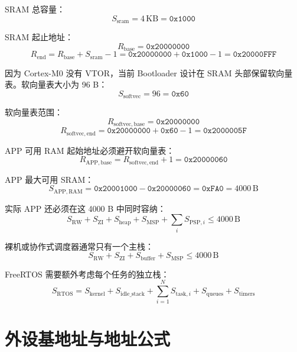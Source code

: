 \documentclass[UTF8,a4paper,11pt]{ctexart}
\newcommand{\addr}[1]{\texttt{#1}}
\begin{document}
SRAM 总容量：
\[
  S_{\mathrm{sram}} = 4\,\mathrm{KB} = \addr{0x1000}
\]

SRAM 起止地址：
\[
  R_{\mathrm{base}} = \addr{0x20000000}
\]
\[
  R_{\mathrm{end}}
  = R_{\mathrm{base}} + S_{\mathrm{sram}} - 1
  = \addr{0x20000000} + \addr{0x1000} - 1
  = \addr{0x20000FFF}
\]

因为 Cortex-M0 没有 VTOR，当前 Bootloader 设计在 SRAM 头部保留软向量表。软向量表大小为 96 B：
\[
  S_{\mathrm{softvec}} = 96 = \addr{0x60}
\]

软向量表范围：
\[
  R_{\mathrm{softvec,base}} = \addr{0x20000000}
\]
\[
  R_{\mathrm{softvec,end}}
  = \addr{0x20000000} + \addr{0x60} - 1
  = \addr{0x2000005F}
\]

APP 可用 RAM 起始地址必须避开软向量表：
\[
  R_{\mathrm{APP,base}}
  = R_{\mathrm{softvec,end}} + 1
  = \addr{0x20000060}
\]

APP 最大可用 SRAM：
\[
  S_{\mathrm{APP,RAM}}
  = \addr{0x20001000} - \addr{0x20000060}
  = \addr{0xFA0}
  = 4000\,\mathrm{B}
\]

实际 APP 还必须在这 4000 B 中同时容纳：
\[
  S_{\mathrm{RW}} + S_{\mathrm{ZI}} + S_{\mathrm{heap}}
  + S_{\mathrm{MSP}} + \sum_i S_{\mathrm{PSP},i}
  \leq 4000\,\mathrm{B}
\]

裸机或协作式调度器通常只有一个主栈：
\[
  S_{\mathrm{RW}} + S_{\mathrm{ZI}} + S_{\mathrm{buffer}} + S_{\mathrm{MSP}}
  \leq 4000\,\mathrm{B}
\]

FreeRTOS 需要额外考虑每个任务的独立栈：
\[
  S_{\mathrm{RTOS}}
  =
  S_{\mathrm{kernel}}
  + S_{\mathrm{idle\_stack}}
  + \sum_{i=1}^{N} S_{\mathrm{task},i}
  + S_{\mathrm{queues}}
  + S_{\mathrm{timers}}
\]

\section{外设基地址与地址公式}
\end{document}
